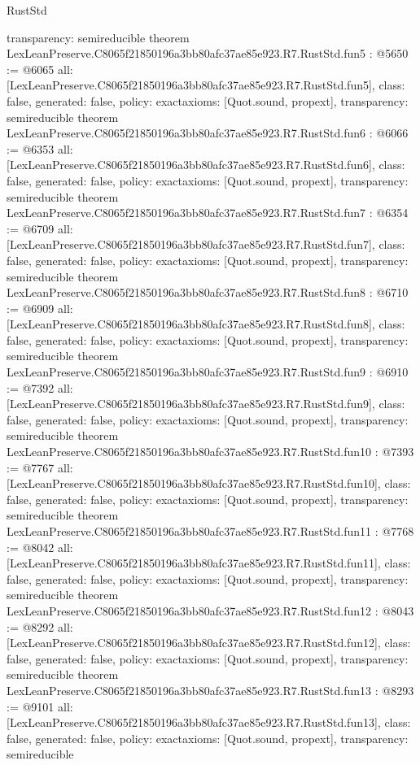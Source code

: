 \begin{lexlean}{RustStd}
\begin{coremodule}
{  transparency: semireducible
}
theorem LexLeanPreserve.C8065f21850196a3bb80afc37ae85e923.R7.RustStd.fun5 : @5650 := @6065 {
  all: [LexLeanPreserve.C8065f21850196a3bb80afc37ae85e923.R7.RustStd.fun5],
  class: false,
  generated: false,
  policy: exact{axioms: [Quot.sound, propext]},
  transparency: semireducible
}
theorem LexLeanPreserve.C8065f21850196a3bb80afc37ae85e923.R7.RustStd.fun6 : @6066 := @6353 {
  all: [LexLeanPreserve.C8065f21850196a3bb80afc37ae85e923.R7.RustStd.fun6],
  class: false,
  generated: false,
  policy: exact{axioms: [Quot.sound, propext]},
  transparency: semireducible
}
theorem LexLeanPreserve.C8065f21850196a3bb80afc37ae85e923.R7.RustStd.fun7 : @6354 := @6709 {
  all: [LexLeanPreserve.C8065f21850196a3bb80afc37ae85e923.R7.RustStd.fun7],
  class: false,
  generated: false,
  policy: exact{axioms: [Quot.sound, propext]},
  transparency: semireducible
}
theorem LexLeanPreserve.C8065f21850196a3bb80afc37ae85e923.R7.RustStd.fun8 : @6710 := @6909 {
  all: [LexLeanPreserve.C8065f21850196a3bb80afc37ae85e923.R7.RustStd.fun8],
  class: false,
  generated: false,
  policy: exact{axioms: [Quot.sound, propext]},
  transparency: semireducible
}
theorem LexLeanPreserve.C8065f21850196a3bb80afc37ae85e923.R7.RustStd.fun9 : @6910 := @7392 {
  all: [LexLeanPreserve.C8065f21850196a3bb80afc37ae85e923.R7.RustStd.fun9],
  class: false,
  generated: false,
  policy: exact{axioms: [Quot.sound, propext]},
  transparency: semireducible
}
theorem LexLeanPreserve.C8065f21850196a3bb80afc37ae85e923.R7.RustStd.fun10 : @7393 := @7767 {
  all: [LexLeanPreserve.C8065f21850196a3bb80afc37ae85e923.R7.RustStd.fun10],
  class: false,
  generated: false,
  policy: exact{axioms: [Quot.sound, propext]},
  transparency: semireducible
}
theorem LexLeanPreserve.C8065f21850196a3bb80afc37ae85e923.R7.RustStd.fun11 : @7768 := @8042 {
  all: [LexLeanPreserve.C8065f21850196a3bb80afc37ae85e923.R7.RustStd.fun11],
  class: false,
  generated: false,
  policy: exact{axioms: [Quot.sound, propext]},
  transparency: semireducible
}
theorem LexLeanPreserve.C8065f21850196a3bb80afc37ae85e923.R7.RustStd.fun12 : @8043 := @8292 {
  all: [LexLeanPreserve.C8065f21850196a3bb80afc37ae85e923.R7.RustStd.fun12],
  class: false,
  generated: false,
  policy: exact{axioms: [Quot.sound, propext]},
  transparency: semireducible
}
theorem LexLeanPreserve.C8065f21850196a3bb80afc37ae85e923.R7.RustStd.fun13 : @8293 := @9101 {
  all: [LexLeanPreserve.C8065f21850196a3bb80afc37ae85e923.R7.RustStd.fun13],
  class: false,
  generated: false,
  policy: exact{axioms: [Quot.sound, propext]},
  transparency: semireducible
}
\end{coremodule}
\end{lexlean}
